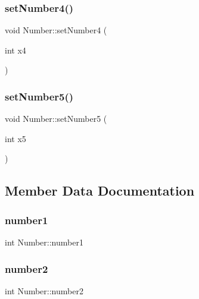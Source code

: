 \mbox{\label{class_number_af1f896568fac63b114f139bf70ffc98d}} 
\subsubsection{setNumber4()}
{\footnotesize\ttfamily void Number\+::set\+Number4 (\begin{DoxyParamCaption}\item[{int}]{x4 }\end{DoxyParamCaption})}

\mbox{\label{class_number_ae9b13d8a7f62a82fcad7368d9fdffadb}} 
\subsubsection{setNumber5()}
{\footnotesize\ttfamily void Number\+::set\+Number5 (\begin{DoxyParamCaption}\item[{int}]{x5 }\end{DoxyParamCaption})}



\subsection{Member Data Documentation}
\mbox{\label{class_number_a64cbb9416d47fbdce7e6add29d750791}} 
\subsubsection{number1}
{\footnotesize\ttfamily int Number\+::number1\hspace{0.3cm}{\ttfamily [protected]}}

\mbox{\label{class_number_a5c75527852001dbbc50064e00a60dc7c}} 
\subsubsection{number2}
{\footnotesize\ttfamily int Number\+::number2\hspace{0.3cm}{\ttfamily [protected]}}

\mbox{\label{class_number_a37d760c6b5cc52b88fcd5423fb2e9cfc}} 
